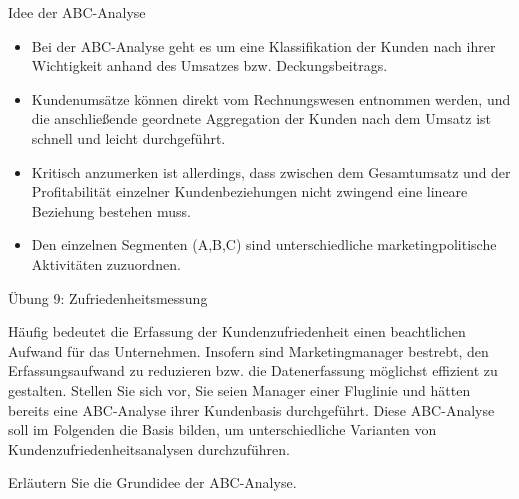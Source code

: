 \documentclass[12pt,ngerman,a4paper,ignorenonframetext,]{beamer}
\providecommand{\tightlist}{%
  \setlength{\itemsep}{0pt}\setlength{\parskip}{0pt}}
\begin{document}
\begin{frame}{Idee der ABC-Analyse}
\protect\hypertarget{idee-der-abc-analyse}{}

\begin{itemize}
\tightlist
\item
  Bei der ABC-Analyse geht es um eine Klassifikation der Kunden nach
  ihrer Wichtigkeit anhand des Umsatzes bzw. Deckungsbeitrags.
\item
  Kundenumsätze können direkt vom Rechnungswesen entnommen werden, und
  die anschließende geordnete Aggregation der Kunden nach dem Umsatz ist
  schnell und leicht durchgeführt.
\item
  Kritisch anzumerken ist allerdings, dass zwischen dem Gesamtumsatz und
  der Profitabilität einzelner Kundenbeziehungen nicht zwingend eine
  lineare Beziehung bestehen muss.
\item
  Den einzelnen Segmenten (A,B,C) sind unterschiedliche
  marketingpolitische Aktivitäten zuzuordnen.
\end{itemize}

\end{frame}

\begin{frame}{Übung 9: Zufriedenheitsmessung}
\protect\hypertarget{ubung-9-zufriedenheitsmessung}{}

Häufig bedeutet die Erfassung der Kundenzufriedenheit einen beachtlichen
Aufwand für das Unternehmen. Insofern sind Marketingmanager bestrebt,
den Erfassungsaufwand zu reduzieren bzw. die Datenerfassung möglichst
effizient zu gestalten. Stellen Sie sich vor, Sie seien Manager einer
Fluglinie und hätten bereits eine ABC-Analyse ihrer Kundenbasis
durchgeführt. Diese ABC-Analyse soll im Folgenden die Basis bilden, um
unterschiedliche Varianten von Kundenzufriedenheitsanalysen
durchzuführen.

Erläutern Sie die Grundidee der ABC-Analyse.


\end{frame}
\end{document}
